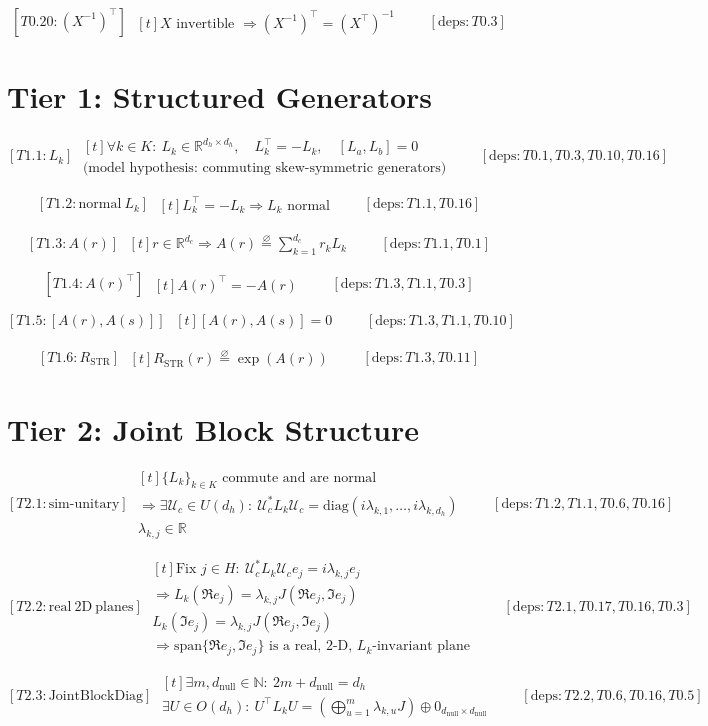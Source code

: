 \documentclass[11pt]{article}
\newcommand{\eqdef}{\overset{\varnothing}{=}}
\newcommand{\ProofBlock}[3]{%
  \begin{equation*}
    \boxed{[#1]}\;
    \begin{aligned}[t]
      #2
    \end{aligned}
    \qquad [\mathrm{deps}: #3]
  \end{equation*}
}
\newcommand{\Note}[1]{\text{(#1)}}
\newcommand{\Real}{\mathbb{R}}
\begin{document}
\ProofBlock{T0.20:(X^{-1})^\top}{
X \text{ invertible } \Rightarrow (X^{-1})^\top = (X^\top)^{-1}
}{T0.3}

\section{Tier 1: Structured Generators}

\ProofBlock{T1.1:L_k}{
\forall k\in K:\ L_k \in \Real^{d_h\times d_h},\quad L_k^\top = -L_k,\quad [L_a,L_b]=0\\
\Note{model hypothesis: commuting skew-symmetric generators}
}{T0.1,T0.3,T0.10,T0.16}

\ProofBlock{T1.2:\mathrm{normal}\ L_k}{
L_k^\top = -L_k \Rightarrow L_k \text{ normal}
}{T1.1,T0.16}

\ProofBlock{T1.3:A(r)}{
r\in \Real^{d_c} \Rightarrow A(r) \eqdef \sum_{k=1}^{d_c} r_k L_k
}{T1.1,T0.1}

\ProofBlock{T1.4:A(r)^\top}{
A(r)^\top = -A(r)
}{T1.3,T1.1,T0.3}

\ProofBlock{T1.5:[A(r),A(s)]}{
[A(r),A(s)] = 0
}{T1.3,T1.1,T0.10}

\ProofBlock{T1.6:R_{\mathrm{STR}}}{
R_{\mathrm{STR}}(r) \eqdef \exp(A(r))
}{T1.3,T0.11}

\section{Tier 2: Joint Block Structure}

\ProofBlock{T2.1:\mathrm{sim}\text{-}\mathrm{unitary}}{
\{L_k\}_{k\in K} \text{ commute and are normal}\\
\Rightarrow \exists \mathcal{U}_c \in U(d_h):\ \mathcal{U}_c^* L_k \mathcal{U}_c = \mathrm{diag}(i\lambda_{k,1},\dots,i\lambda_{k,d_h})\\
\lambda_{k,j}\in\Real
}{T1.2,T1.1,T0.6,T0.16}

\ProofBlock{T2.2:\mathrm{real}\ 2\text{D}\ \mathrm{planes}}{
\text{Fix } j\in H:\ \mathcal{U}_c^*L_k\mathcal{U}_c e_j = i\lambda_{k,j} e_j\\
\Rightarrow L_k(\Re e_j) = \lambda_{k,j} J (\Re e_j,\Im e_j)\\
L_k(\Im e_j) = \lambda_{k,j} J (\Re e_j,\Im e_j)\\
\Rightarrow \mathrm{span}\{\Re e_j,\Im e_j\} \text{ is a real, }2\text{-D, }L_k\text{-invariant plane}
}{T2.1,T0.17,T0.16,T0.3}

\ProofBlock{T2.3:\mathrm{JointBlockDiag}}{
\exists m,d_{\mathrm{null}}\in\mathbb{N}:\ 2m+d_{\mathrm{null}}=d_h\\
\exists U\in O(d_h):\ U^\top L_k U
 = \left(\bigoplus_{u=1}^m \lambda_{k,u} J\right)\oplus 0_{d_{\mathrm{null}}\times d_{\mathrm{null}}}
}{T2.2,T0.6,T0.16,T0.5}
\end{document}

